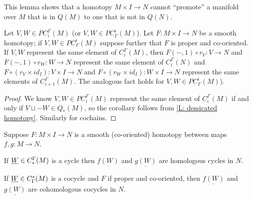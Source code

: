 This lemma shows that a homotopy $M \times I \to N$ cannot ``promote'' a manifold over $M$ that is in $Q(M)$ to one that is not in $Q(N)$.

\begin{corollary}
	Let $V, W \in PC_i^\Gamma(M)$ (or $V, W \in PC^i_\Gamma(M)$).
	Let $F \colon M \times I \to N$ be a smooth homotopy; if $V,W \in PC^i_\Gamma(M)$ suppose further that $F$ is proper and co-oriented.
	If $V,W$ represent the same element of $C_i^\Gamma(M)$, then $F(-,1) \circ r_V: V \to N$ and
	$F(-,1) \circ r_W: W \to N$ represent the same element of $C_i^\Gamma(N)$ and $F \circ (r_V \times id_I) \colon V \times I \to N$ and $F \circ (r_W \times id_I) \colon W \times I \to N$ represent the same elements of $C_{i+1}^\Gamma(M)$. The analogous fact holds for $V, W \in PC^i_\Gamma(M)$).
\end{corollary}

\begin{proof}
	We know $V, W \in PC_i^\Gamma(M)$ represent the same element of $C_i^\Gamma(M)$ if and only if $V \sqcup -W \in Q_*(M)$, so the corollary follows from \cref{L: dessicated homotopy}. Similarly for cochains.
\end{proof}

\begin{corollary}\label{C: homotopy}
	Suppose $F \colon M \times I \to N$ is a smooth (co-oriented) homotopy between maps $f,g \colon M \to N$.

	If $\underline{W} \in C_*^\Gamma(M)$ is a cycle then $\underline{f(W)}$ and $\underline{g(W)}$ are homologous cycles in $N$.

	If $\underline{W} \in C^*_\Gamma(M)$ is a cocycle and $F$ if proper and co-oriented, then $\underline{f(W)}$ and $\underline{g(W)}$ are cohomologous cocycles in $N$.
\end{corollary}

